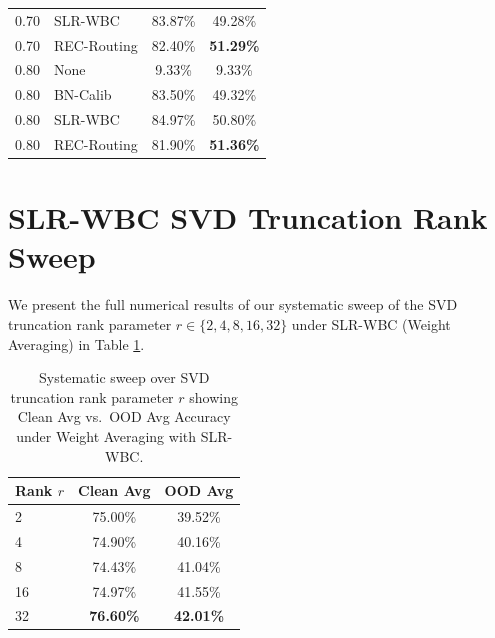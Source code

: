 \documentclass{article}
\theoremstyle{plain}
\theoremstyle{definition}
\theoremstyle{remark}
\begin{document}
\begin{table}[H]
\begin{center}
\begin{small}
\begin{sc}
\begin{tabular}{llcc}
0.70 & SLR-WBC & 83.87\% & 49.28\% \\
0.70 & REC-Routing & 82.40\% & \textbf{51.29\%} \\
\midrule
0.80 & None & 9.33\% & 9.33\% \\
0.80 & BN-Calib & 83.50\% & 49.32\% \\
0.80 & SLR-WBC & 84.97\% & 50.80\% \\
0.80 & REC-Routing & 81.90\% & \textbf{51.36\%} \\
\bottomrule
\end{tabular}
\end{sc}
\end{small}
\end{center}
\vskip -0.1in
\end{table}

\clearpage
\section{SLR-WBC SVD Truncation Rank Sweep}
\label{sec:rank_appendix}
We present the full numerical results of our systematic sweep of the SVD truncation rank parameter $r \in \{2, 4, 8, 16, 32\}$ under SLR-WBC (Weight Averaging) in Table \ref{tab:rank_sweep}.

\begin{table}[H]
\caption{Systematic sweep over SVD truncation rank parameter $r$ showing Clean Avg vs.\ OOD Avg Accuracy under Weight Averaging with SLR-WBC.}
\label{tab:rank_sweep}
\vskip 0.15in
\begin{center}
\begin{small}
\begin{sc}
\begin{tabular}{lcc}
\toprule
Rank $r$ & Clean Avg & OOD Avg \\
\midrule
2  & 75.00\% & 39.52\% \\
4  & 74.90\% & 40.16\% \\
8  & 74.43\% & 41.04\% \\
16 & 74.97\% & 41.55\% \\
32 & \textbf{76.60\%} & \textbf{42.01\%} \\
\bottomrule
\end{tabular}
\end{sc}
\end{small}
\end{center}
\vskip -0.1in
\end{table}
\end{document}
